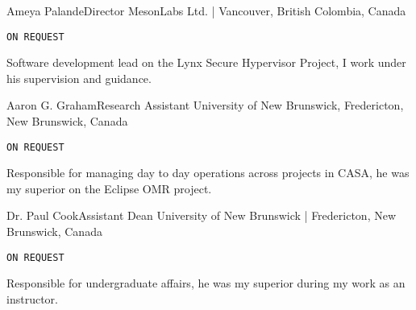 \documentclass{developercv} %
\begin{document}

\entrys%
{Ameya Palande}{Director}
{MesonLabs Ltd. | Vancouver, British Colombia, Canada}
{\texttt{ON REQUEST} 

	Software development lead on the Lynx Secure Hypervisor Project, I work under his supervision and guidance.
}

\entrys%
{Aaron G. Graham}{Research Assistant}
{University of New Brunswick, Fredericton, New Brunswick, Canada}
{\texttt{ON REQUEST}

	Responsible for managing day to day operations across projects in CASA, he was my superior on the Eclipse OMR project.
}

\entrys%
{Dr. Paul Cook}{Assistant Dean}
{University of New Brunswick | Fredericton, New Brunswick, Canada}
{\texttt{ON REQUEST}

	Responsible for undergraduate affairs, he was my superior during my work as an instructor.
}

\ifdefined{}\fi
\end{document}

